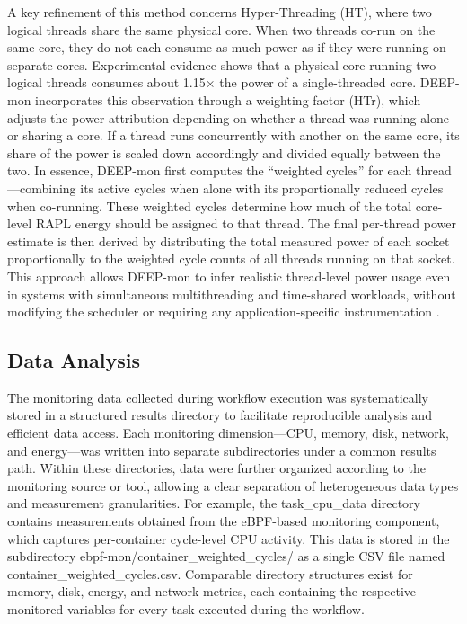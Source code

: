 A key refinement of this method concerns Hyper-Threading (HT), where two logical threads share the same physical core. When two threads co-run on the same core, they do not each consume as much power as if they were running on separate cores. Experimental evidence shows that a physical core running two logical threads consumes about 1.15× the power of a single-threaded core. DEEP-mon incorporates this observation through a weighting factor (HTr), which adjusts the power attribution depending on whether a thread was running alone or sharing a core. If a thread runs concurrently with another on the same core, its share of the power is scaled down accordingly and divided equally between the two.
In essence, DEEP-mon first computes the “weighted cycles” for each thread—combining its active cycles when alone with its proportionally reduced cycles when co-running. These weighted cycles determine how much of the total core-level RAPL energy should be assigned to that thread. The final per-thread power estimate is then derived by distributing the total measured power of each socket proportionally to the weighted cycle counts of all threads running on that socket. This approach allows DEEP-mon to infer realistic thread-level power usage even in systems with simultaneous multithreading and time-shared workloads, without modifying the scheduler or requiring any application-specific instrumentation \cite{8425477}.


\subsection{Data Analysis}
\label{sec:data_analysis}
The monitoring data collected during workflow execution was systematically stored in a structured results directory to facilitate reproducible analysis and efficient data access. Each monitoring dimension—CPU, memory, disk, network, and energy—was written into separate subdirectories under a common results path. Within these directories, data were further organized according to the monitoring source or tool, allowing a clear separation of heterogeneous data types and measurement granularities. For example, the task_cpu_data directory contains measurements obtained from the eBPF-based monitoring component, which captures per-container cycle-level CPU activity. This data is stored in the subdirectory ebpf-mon/container_weighted_cycles/ as a single CSV file named container_weighted_cycles.csv. Comparable directory structures exist for memory, disk, energy, and network metrics, each containing the respective monitored variables for every task executed during the workflow.

